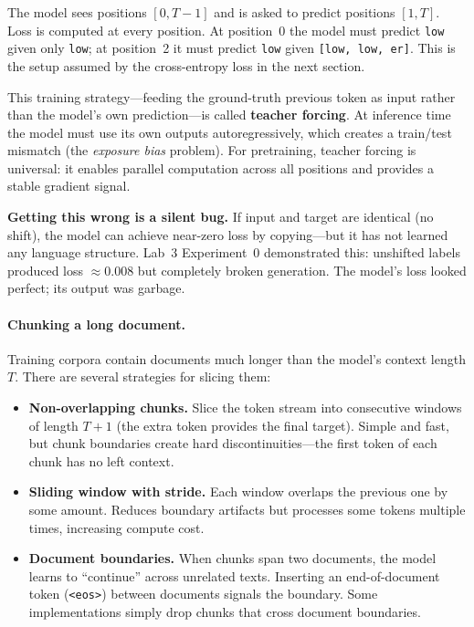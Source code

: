 The model sees positions $[0, T{-}1]$ and is asked to predict positions $[1, T]$. Loss is computed at every position. At position~0 the model must predict \texttt{\textvisiblespace low} given only \texttt{low}; at position~2 it must predict \texttt{\textvisiblespace low} given \texttt{[low, \textvisiblespace low, er]}. This is the setup assumed by the cross-entropy loss in the next section.

This training strategy---feeding the ground-truth previous token as input rather than the model's own prediction---is called \textbf{teacher forcing}. At inference time the model must use its own outputs autoregressively, which creates a train/test mismatch (the \emph{exposure bias} problem). For pretraining, teacher forcing is universal: it enables parallel computation across all positions and provides a stable gradient signal.

\textbf{Getting this wrong is a silent bug.} If input and target are identical (no shift), the model can achieve near-zero loss by copying---but it has not learned any language structure. Lab~3 Experiment~0 demonstrated this: unshifted labels produced loss $\approx 0.008$ but completely broken generation. The model's loss looked perfect; its output was garbage.

\paragraph{Chunking a long document.} Training corpora contain documents much longer than the model's context length $T$. There are several strategies for slicing them:

\begin{itemize}[nosep]
  \item \textbf{Non-overlapping chunks.} Slice the token stream into consecutive windows of length $T+1$ (the extra token provides the final target). Simple and fast, but chunk boundaries create hard discontinuities---the first token of each chunk has no left context.
  \item \textbf{Sliding window with stride.} Each window overlaps the previous one by some amount. Reduces boundary artifacts but processes some tokens multiple times, increasing compute cost.
  \item \textbf{Document boundaries.} When chunks span two documents, the model learns to ``continue'' across unrelated texts. Inserting an end-of-document token (\texttt{<eos>}) between documents signals the boundary. Some implementations simply drop chunks that cross document boundaries.
\end{itemize}

